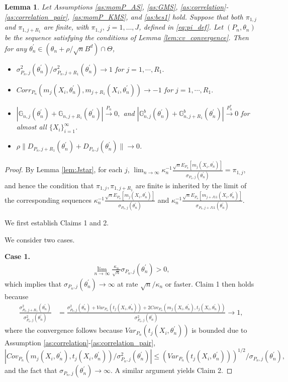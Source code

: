 \documentclass[letterpaper,11pt]{article}
\theoremstyle{myplain}
\newtheorem{lemma}{Lemma}[section]
\theoremstyle{mydefinition}
\theoremstyle{myremark}
\newcommand{\thetnprime}{(\theta_n +\rho /\sqrt{n} B^d)\cap \Theta}
\numberwithin{equation}{section}
\numberwithin{figure}{section}
\begin{document}
\begin{appendices}
\begin{lemma} \label{lem:pair}
Let Assumptions \ref{as:momP_AS}, \ref{as:GMS}, \ref{as:correlation}-\ref{as:correlation_pair}, \ref{as:momP_KMS}, and \ref{as:bcs1} hold.  
Suppose that both $\pi_{1,j}$ and $\pi_{1,j+R_1}$ are finite, with $\pi_{1,j},~j=1,\dots,J$, defined in \eqref{eq:pi_def}. Let $(P_n,\theta_n)$ be the sequence satisfying the conditions of Lemma \ref{lem:cv_convergence}.
Then for any $\theta^\prime_n \in \thetnprime$,
\begin{itemize}
	\item[(1)] $\sigma^2_{P_{n},j}(\theta^\prime_n)/\sigma^2_{P_{n},{j+R_1}}(\theta^\prime_n) \to 1$ for $j=1,\cdots,R_1.$
	\item[(2)] $Corr_{P_{n}}(m_j(X_i,\theta^\prime_n),m_{j+R_1}(X_i,\theta^\prime_n))\to -1$ for $j=1,\cdots,R_1.$
	\item[(3)]
	$|\mathbb G_{n,j}(\theta^\prime_n)+\mathbb G_{n,j+{R_1}}(\theta^\prime_n)|\stackrel{P_n}{\to}0,$ and $|\mathbb G_{n,j}^b(\theta^\prime_n)+\mathbb G_{n,j+{R_1}}^b(\theta^\prime_n)|\stackrel{P^*_n}{\to}0$ for almost all $\{X_i\}_{i=1}^\infty$.
	\item[(4)]
 $\rho \|D_{P_{n},j+R_1}(\theta^\prime_n)+D_{P_{n},j}(\theta^\prime_n)\| \to 0$.
 \end{itemize}
\end{lemma}
\begin{proof}
By Lemma \ref{lem:Jstar}, for each $j$, $\lim_{n \to \infty}\kappa_n^{-1}\frac{\sqrt nE_{P_n}[m_j(X_i,\theta^\prime_{n})]}{\sigma_{P_n,j}(\theta^\prime_{n})} = \pi_{1,j} $, and hence the condition that $\pi_{1,j},\pi_{1,j+R_1}$ are finite is inherited by the limit of the corresponding sequences $\kappa_n^{-1}\frac{\sqrt nE_{P_n}[m_j(X_i,\theta^\prime_{n})]}{\sigma_{P_n,j}(\theta^\prime_{n})}$ and $\kappa_n^{-1}\frac{\sqrt nE_{P_n}[m_{j+J{11}}(X_i,\theta^\prime_{n})]}{\sigma_{P_n,j+J{11}}(\theta^\prime_{n})}$.

We first establish Claims 1 and 2. 

We consider two cases.

\noindent \textbf{Case 1.}
\begin{align}
\lim_{n \to \infty} \frac{\kappa_n}{\sqrt n}\sigma_{P_n,j}(\theta^\prime_n) > 0,
\end{align}
which implies that $\sigma_{P_n,j}(\theta^\prime_n) \to \infty$ at rate $\sqrt n/\kappa_n$ or faster.
Claim 1 then holds because
\begin{align}
\frac{\sigma^2_{P_n,j+R_1}(\theta^\prime_n)}{\sigma^2_{P_n,j}(\theta^\prime_n)}&=\frac{\sigma^2_{P_n,j}(\theta^\prime_n) + Var_{P_n}(t_j(X_i,\theta^\prime_n))+2Cov_{P_n}(m_j(X_i,\theta^\prime_n),t_j(X_i,\theta^\prime_n))}{\sigma^2_{P_n,j}(\theta^\prime_n)}\to 1,\label{decompose}
\end{align}
where the convergence follows because $Var_{P_n}(t_j(X_i,\theta^\prime_n))$ is bounded due to Assumption \ref{as:correlation}-\ref{as:correlation_pair}, 
\[|Cov_{P_n}(m_j(X_i,\theta^\prime_n),t_j(X_i,\theta^\prime_n))/\sigma^2_{P_n,j}(\theta^\prime_n)| \le (Var_{P_n}(t_j(X_i,\theta^\prime_n)))^{1/2}/\sigma_{P_n,j}(\theta^\prime_n),\]
 and the fact that $\sigma_{P_n,j}(\theta^\prime_n) \to \infty$.
A similar argument yields Claim 2.


\end{proof}
\end{appendices}
\end{document}

